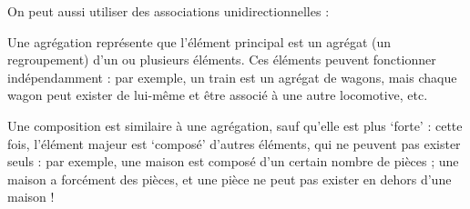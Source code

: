 \documentclass[10pt,a4paper,french]{article}
\begin{document}
On peut aussi utiliser des associations unidirectionnelles :


Une agrégation représente que l'élément principal est un agrégat (un regroupement) d'un ou plusieurs éléments. Ces éléments peuvent fonctionner indépendamment : par exemple, un train est un agrégat de wagons, mais chaque wagon peut exister de lui-même et être associé à une autre locomotive, etc.


Une composition est similaire à une agrégation, sauf qu'elle est plus `forte' : cette fois, l'élément majeur est `composé' d'autres éléments, qui ne peuvent pas exister seuls : par exemple, une maison est composé d'un certain nombre de pièces ; une maison a forcément des pièces, et une pièce ne peut pas exister en dehors d'une maison !


\appendix %

\printindex
\printglossaries
\end{document}

